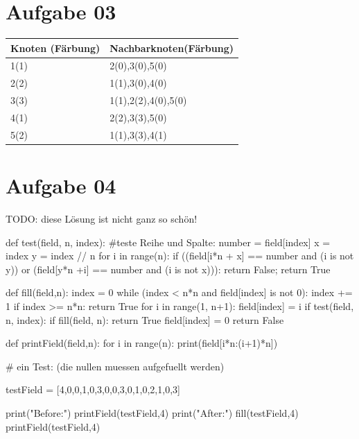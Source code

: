 \documentclass[10pt,a4paper]{article}
\begin{document}
\section*{Aufgabe 03}
    \begin{tabular}{|l |l|}
        \hline
        Knoten (Färbung) & Nachbarknoten(Färbung) \\
        \hline \hline
        1(1) & 2(0),3(0),5(0) \\ \hline
        2(2) & 1(1),3(0),4(0) \\ \hline
        3(3) & 1(1),2(2),4(0),5(0) \\ \hline
        4(1) & 2(2),3(3),5(0) \\ \hline
        5(2) & 1(1),3(3),4(1)\\ \hline
    \end{tabular}


\section*{Aufgabe 04}
    TODO: diese L\"osung ist nicht ganz so sch\"on!

    \begin{python}[frame=single]
def test(field, n, index):
    #teste Reihe und Spalte:
    number = field[index]
    x = index %
    y = index // n
    for i in range(n):
        if ((field[i*n + x] == number and (i is not y))
            or (field[y*n +i] == number and (i is not x))):
            return False;
    return True

def fill(field,n):
    index = 0
    while (index < n*n and field[index] is not 0):
        index += 1
    if index >= n*n:
        return True
    for i in range(1, n+1):
        field[index] = i
        if test(field, n, index):
            if fill(field, n):
                return True
    field[index] = 0
    return False


def printField(field,n):
    for i in range(n):
        print(field[i*n:(i+1)*n])

# ein Test: (die nullen muessen aufgefuellt werden)

testField = [4,0,0,1,0,3,0,0,3,0,1,0,2,1,0,3]

print("Before:")
printField(testField,4)
print("After:")
fill(testField,4)
printField(testField,4)

    \end{python}
\end{document}
